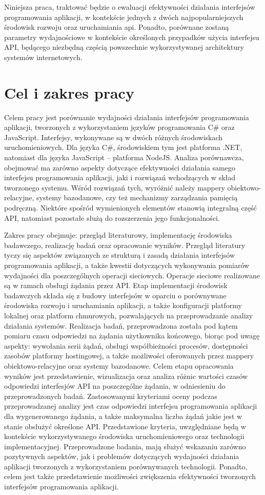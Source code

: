 Niniejsza praca, traktować będzie o ewaluacji efektywności działania interfejsów programowania aplikacji, w kontekście jednych z dwóch najpopularniejszych środowisk rozwoju oraz uruchamiania api. Ponadto, porównane zostaną parametry wydajnościowe w kontekście określonych przypadków użycia interfejsu API, będącego niezbędną częścią powszechnie wykorzystywanej architektury systemów internetowych.
\section{Cel i zakres pracy}
Celem pracy jest porównanie wydajności działania interfejsów programowania aplikacji, tworzonych z wykorzystaniem języków programowania C\# oraz JavaScript. Interfejsy, wykonywane są w dwóch różnych środowiskach uruchomieniowych. Dla języka C\#, środowiskiem tym jest platforma .NET, natomiast dla języka JavaScript – platforma NodeJS. Analiza porównawcza, obejmować ma zarówno aspekty dotyczące efektywności działania samego interfejsu programowania aplikacji, jaki i rozwiązań wchodzących w skład tworzonego systemu. Wśród rozwiązań tych, wyróżnić należy mappery obiektowo-relacyjne, systemy bazodanowe, czy też mechanizmy zarządzania pamięcią podręczną. Niektóre spośród wymienionych elementów stanowią integralną część API, natomiast pozostałe służą do rozszerzenia jego funkcjonalności.

Zakres pracy obejmuje: przegląd literaturowy, implementację środowiska badawczego, realizację badań oraz opracowanie wyników. Przegląd literatury tyczy się aspektów związanych ze strukturą i zasadą działania interfejsów programowania aplikacji, a także kwestii dotyczących wykonywania pomiarów wydajności dla poszczególnych operacji sieciowych. Operacje sieciowe realizowane są w ramach obsługi żądania przez API. Etap implementacji środowisk badawczych składa się z budowy interfejsów w oparciu o porównywane środowiska rozwoju i uruchamiania aplikacji, a także konfiguracji platformy lokalnej oraz platform chmurowych, pozwalających na przeprowadzanie analizy działania systemów. Realizacja badań, przeprowadzona została pod kątem pomiaru czasu odpowiedzi na żądania użytkownika końcowego, biorąc pod uwagę aspekty: wywołania serii żądań, obsługi współbieżności procesów, dostępności zasobów platformy hostingowej, a także możliwości oferowanych przez mappery obiektowo-relacyjne oraz systemy bazodanowe. Celem etapu opracowania wyników jest przedstawienie, wizualizacja oraz analiza różnic wartości czasów odpowiedzi interfesjów API na poszczególne żądania, w odniesieniu do przeprowadzonych badań. Zastosowanymi kryteriami oceny podczas przeprowadzanej analizy jest czas odpowiedzi interfejsu programowania aplikacji dla wygenerowanego żądania, a także maksymalna liczba żądań jakie jest w stanie obsłużyć określone API. Przedstawione kryteria, uwzględniane będą w kontekście wykorzystywanego środowiska uruchomieniowego oraz technologii implementacyjnej. Przeprowadzone badania, mają służyć wskazaniu zarówno pozytywnych aspektów, jak i problemów dotyczących wydajności działania aplikacji tworzonych z wykorzystaniem porównywanych technologii. Ponadto, celem jest także przedstawienie możliwości zwiększenia efektywności tworzonych interfejsów programowania aplikacji.
